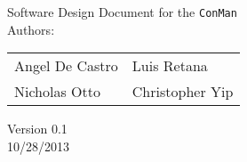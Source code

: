 \begin{titlepage}
\Huge
\vspace{2cm}
\begin{center}
Software Design Document for the \texttt{ConMan}\\
\vspace{3cm}
\Large
Authors:\\ 

\begin{tabular}{l l}\hline
Angel De Castro & Luis Retana\\
Nicholas Otto   & Christopher Yip
\end{tabular}
\vspace{1cm}

Version 0.1\\
10/28/2013
\end{center}


\end{titlepage}
